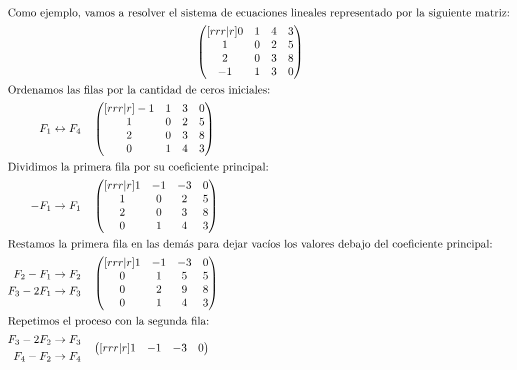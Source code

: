 \documentclass[../teoria.root.tex]{subfiles}
\begin{document}
\begin{gather*}
	\intertext{Como ejemplo, vamos a resolver el sistema de ecuaciones lineales
	representado por la siguiente matriz:}
	\begin{pmatrix}[rrr|r]
		 0 & 1 & 4 & 3\\
		 1 & 0 & 2 & 5\\
		 2 & 0 & 3 & 8\\
		-1 & 1 & 3 & 0
	\end{pmatrix}\\
	\begin{align*}
		\intertext{Ordenamos las filas por la cantidad de ceros iniciales:}
		F_1\leftrightarrow F_4\quad
		&\begin{pmatrix}[rrr|r]
			-1 & 1 & 3 & 0\\
			 1 & 0 & 2 & 5\\
			 2 & 0 & 3 & 8\\
			 0 & 1 & 4 & 3
		\end{pmatrix}\\
		\intertext{Dividimos la primera fila por su coeficiente principal:}
		-F_1\to F_1\quad
		&\begin{pmatrix}[rrr|r]
			1 & -1 & -3 & 0\\
			1 &  0 &  2 & 5\\
			2 &  0 &  3 & 8\\
			0 &  1 &  4 & 3
		\end{pmatrix}\\
		\intertext{Restamos la primera fila en las demás para dejar vacíos los
		valores debajo del coeficiente principal:}
		\begin{aligned}
			F_2-F_1&\to F_2\\
			F_3-2F_1&\to F_3\\
		\end{aligned}\quad
		&\begin{pmatrix}[rrr|r]
			1 & -1 & -3 & 0\\
			0 &  1 &  5 & 5\\
			0 &  2 &  9 & 8\\
			0 &  1 &  4 & 3
		\end{pmatrix}\\
		\intertext{Repetimos el proceso con la segunda fila:}
		\begin{aligned}
			F_3-2F_2&\to F_3\\
			F_4-F_2&\to F_4\\
		\end{aligned}\quad
		&\begin{pmatrix}[rrr|r]
			1 & -1 & -3 &  0\\

\end{pmatrix}
\end{align*}
\end{gather*}
\end{document}
